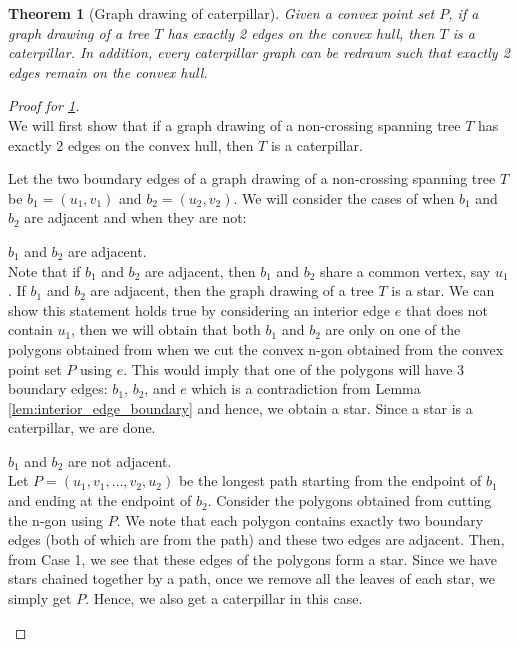 \documentclass{article}
\newtheorem{theorem}{Theorem}[section]
\begin{document}
\begin{theorem}[Graph drawing of caterpillar]
	\label{theorem:caterpillar_graph_drawing}
	Given a convex point set $P$, if a graph drawing of a tree $T$ has exactly 2 edges on the convex hull, then $T$ is a caterpillar. In addition, every caterpillar graph can be redrawn such that exactly 2 edges remain on the convex hull.
\end{theorem}
\begin{proof}[Proof for \ref{theorem:caterpillar_graph_drawing}]
	$ $ \\

	We will first show that if a graph drawing of a non-crossing spanning tree $T$ has exactly 2 edges on the convex hull, then $T$ is a caterpillar.

	Let the two boundary edges of a graph drawing of a non-crossing spanning tree $T$ be $b_1 = (u_1, v_1)$ and $b_2 = (u_2, v_2)$. We will consider the cases of when $b_1$ and $b_2$ are adjacent and when they are not:

	\begin{caseof}
		\item $b_1$ and $b_2$ are adjacent.\\
		Note that if $b_1$ and $b_2$ are adjacent, then $b_1$ and $b_2$ share a common vertex, say $u_1$.
		If $b_1$ and $b_2$ are adjacent, then the graph drawing of a tree $T$ is a star. We can show this statement holds true by considering an interior edge $e$ that does not contain $u_1$, then we will obtain that both $b_1$ and $b_2$ are only on one of the polygons obtained from when we cut the convex n-gon obtained from the convex point set $P$ using $e$. This would imply that one of the polygons will have 3 boundary edges: $b_1$, $b_2$, and $e$ which is a contradiction from Lemma \ref{lem:interior_edge_boundary} and hence, we obtain a star. Since a star is a caterpillar, we are done.

		\item $b_1$ and $b_2$ are not adjacent.\\
		Let $P = (u_1, v_1, \dots, v_2, u_2)$ be the longest path starting from the endpoint of $b_1$ and ending at the endpoint of $b_2$. Consider the polygons obtained from cutting the n-gon using $P$. We note that each polygon contains exactly two boundary edges (both of which are from the path) and these two edges are adjacent. Then, from Case 1, we see that these edges of the polygons form a star. Since we have stars chained together by a path, once we remove all the leaves of each star, we simply get $P$. Hence, we also get a caterpillar in this case.
	\end{caseof}


\end{proof}
\end{document}
